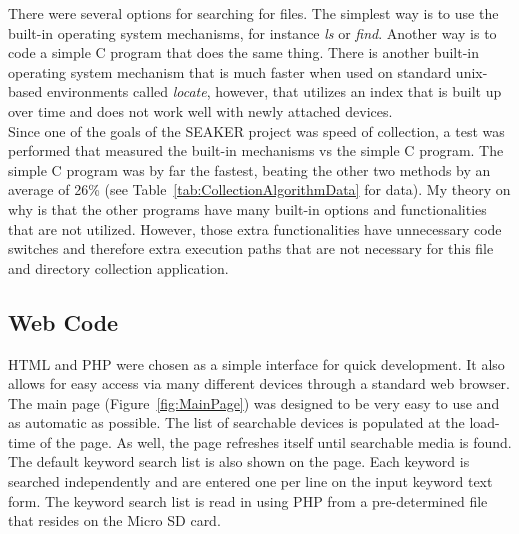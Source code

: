 \documentclass[12pt]{article}
\begin{document}
There were several options for searching for files.  The simplest way is to use
the built-in operating system mechanisms, for instance {\em ls} or {\em find}.
Another way is to code a simple C program that does the same thing.  There is
another built-in operating system mechanism that is much faster when used on
standard unix-based environments called {\em locate}, however, that utilizes
an index that is built up over time and does not work well with newly
attached devices.\\

Since one of the goals of the SEAKER project was speed of collection, a test
was performed that
measured the built-in mechanisms vs the simple C program.  The simple C program
was by far the fastest, beating the other two methods by an average of 26\%
(see Table~\ref{tab:CollectionAlgorithmData} for data).
My theory on why is that the other programs have many
built-in options and functionalities that are not utilized.  However,
those extra functionalities have unnecessary code switches and therefore extra
execution paths that are not necessary for this file and directory collection
application.\\

\subsection{Web Code}

HTML and PHP were chosen as a simple interface for quick development.  It also
allows for easy access via many different devices through a standard web 
browser.\\

The main page (Figure~\ref{fig:MainPage}) was designed to be very easy to use
and as automatic as possible.
The list of searchable devices is populated at the load-time of the page.  As
well, the page refreshes itself until searchable media is found.  The 
default keyword search list is also shown on the page.  Each keyword is
searched independently and are entered one per line on the input keyword
text form.  The keyword search list is read in using
PHP from a pre-determined file that resides on the Micro SD card.\\
\end{document}
